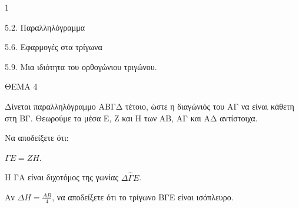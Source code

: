 \begin{ylh}{1}
    \item 5.2. Παραλληλόγραμμα
    \item 5.6. Εφαρμογές στα τρίγωνα
    \item 5.9. Μια ιδιότητα του ορθογώνιου τριγώνου.
\end{ylh}

ΘΕΜΑ 4

Δίνεται παραλληλόγραμμο ΑΒΓΔ τέτοιο, ώστε η διαγώνιός του ΑΓ να είναι κάθετη στη ΒΓ. Θεωρούμε τα μέσα Ε, Ζ και Η των ΑΒ, ΑΓ και ΑΔ αντίστοιχα.

\begin{alist}
\item Να αποδείξετε ότι:

\begin{alist}
\item
  $\Gamma Ε = ΖΗ$. 
\item
  Η ΓΑ είναι διχοτόμος της γωνίας $\Delta\widehat{\Gamma}Ε$. 

\item Αν $\Delta Η = \frac{ΑΒ}{4}$, να αποδείξετε ότι το τρίγωνο ΒΓΕ είναι ισόπλευρο. 


\begin{center}
\end{center}
\end{alist}
\end{alist}
